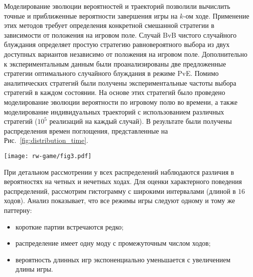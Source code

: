 Моделирование эволюции вероятностей и траекторий позволили вычислить точные и приближенные вероятности завершения игры на $k$-ом ходе. Применение этих методов требует определения конкретной смешанной стратегии в зависимости от положения на игровом поле. Случай BvB чистого случайного блуждания определяет простую стратегию равновероятного выбора из двух доступных вариантов независимо от положения на игровом поле. Дополнительно к экспериментальным данным были проанализированы две предложенные стратегии оптимального случайного блуждания в режиме PvE. Помимо аналитических стратегий были получены экспериментальные частоты выбора стратегий в каждом состоянии. На основе этих стратегий было проведено моделирование эволюции вероятности по игровому полю во времени, а также моделирование индивидуальных траекторий с использованием различных стратегий ($10^5$ реализаций на каждый случай). В результате были получены распределения времен поглощения, представленные на Рис.~\cref{fig:distribution_time}.

\begin{figure*}[t]
    \centering
    \texttt{[image: rw-game/fig3.pdf]}
    \caption{
        Распределение количества ходов, полученное моделированием эволюции вероятности (сплошная линия) и численным моделированием (точки) с использованием соответствующих стратегий игроков A и B. Режим BvB (красная линия) представляет собой равновероятный выбор для обоих игроков. Кривые PvE (зеленый и синий) и PvP-режим (фиолетовая линия) были построены на основе соответствующих усредненных стратегий по популяции. Противоположная стратегия в режиме PvE -- это стратегия равновероятного выбора. Оптимальная стратегия для режима PvE в центре (зеленая пунктирная линия) -- держать фишку на диагональной лестнице. Оптимальная стратегия для режима границы PvE (синяя пунктирная линия) -- выбирать движения только вдоль горизонтальной линии. Гистограммы, полученные экспериментально, представлены для режимов PvE (зеленая и синяя области).
    }  
    \label{fig:distribution_time}
    
\end{figure*}

При детальном рассмотрении у всех распределений наблюдаются различия в вероятностях на четных и нечетных ходах. Для оценки характерного поведения распределений, рассмотрим гистограмму с широкими интервалами (длиной в $16$ ходов). Анализ показывает, что все режимы игры следуют одному и тому же паттерну:
\begin{itemize}
\item короткие партии встречаются редко;
\item распределение имеет одну моду с промежуточным числом ходов;
\item вероятность длинных игр экспоненциально уменьшается с увеличением длины игры.
\end{itemize}

